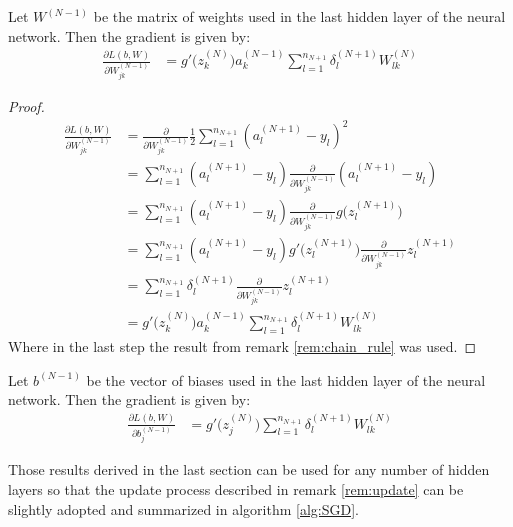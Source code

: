 \begin{remark}
		Let $W^{(N-1)}$ be the matrix of weights used in the last hidden layer of the neural network. Then the gradient is given by: 		
		\begin{align*} %
		\frac{\partial L(b,W)}{\partial W_{jk}^{(N-1)}} 
		&= g'\big( z_k^{(N)}\big) a_k^{(N-1)} \sum_{l = 1}^{n_{N+1}} \delta_l^{(N+1)} W_{lk}^{(N)} 
		\end{align*}		
		
		\begin{proof}
			\begin{align*} %
			\frac{\partial L(b,W)}{\partial W_{jk}^{(N-1)}} 
			&= \frac{\partial}{\partial W_{jk}^{(N-1)}} \frac{1}{2} \sum_{l = 1}^{n_{N+1}} (a_l^{(N+1)} - y_l)^2  \\
			&= \sum_{l = 1}^{n_{N+1}} (a_l^{(N+1)} - y_l) \frac{\partial}{\partial W_{jk}^{(N-1)}} (a_l^{(N+1)} - y_l) \\
			&= \sum_{l = 1}^{n_{N+1}} (a_l^{(N+1)} - y_l) \frac{\partial}{\partial W_{jk}^{(N-1)}} g\big(z_l^{(N+1)} \big) \\
			&= \sum_{l = 1}^{n_{N+1}} (a_l^{(N+1)} - y_l) g'\big(z_l^{(N+1)} \big) \frac{\partial}{\partial W_{jk}^{(N-1)}} z_l^{(N+1)} \\
			&= \sum_{l = 1}^{n_{N+1}} \delta_l^{(N+1)} \frac{\partial}{\partial W_{jk}^{(N-1)}} z_l^{(N+1)} \\
			&= g'\big( z_k^{(N)}\big) a_k^{(N-1)} \sum_{l = 1}^{n_{N+1}} \delta_l^{(N+1)} W_{lk}^{(N)} 
			\end{align*}
			Where in the last step the result from remark \ref{rem:chain_rule} was used. 
		\end{proof}
\end{remark}

\begin{remark}
		Let $b^{(N-1)}$ be the vector of biases used in the last hidden layer of the neural network. Then the gradient is given by:
		\begin{align*} %
			\frac{\partial L(b,W)}{\partial b_j^{(N-1)}} 
			&= g'\big( z_j^{(N)}\big) \sum_{l = 1}^{n_{N+1}} \delta_l^{(N+1)} W_{lk}^{(N)} 
		\end{align*}		
\end{remark}
Those results derived in the last section can be used for any number of hidden layers so that the update process described in remark \ref{rem:update} can be slightly adopted and summarized in algorithm \ref{alg:SGD}. 

